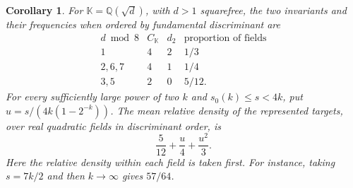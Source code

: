 \documentclass[11pt,letterpaper]{article}
\newtheorem{corollary}[corollary]{Corollary}
\theoremstyle{definition}
\numberwithin{equation}{section}
\begin{document}
\begin{corollary}\label{cor:quadratic-density}
For $\mathbb K=\mathbb Q(\sqrt d)$, with $d>1$ squarefree, the
two invariants and their frequencies when ordered by fundamental
discriminant are
\[
\begin{array}{c|c|c|c}
 d\bmod 8&C_{\mathbb K}& d_2&\text{proportion of fields}\\\hline
 1&4&2&1/3\\
 2,6,7&4&1&1/4\\
 3,5&2&0&5/12 .
\end{array}
\]
For every sufficiently large power of two $k$ and
$s_0(k)\le s<4k$, put $u=s/(4k(1-2^{-k}))$.
The mean relative density of the represented targets, over real quadratic
fields in discriminant order, is
\begin{equation}\label{eq:quadratic-density-polynomial}
                       \frac{5}{12}+\frac{u}{4}+\frac{u^2}{3}.
\end{equation}
Here the relative density within each field is taken first. For instance,
taking $s=7k/2$ and then $k\to\infty$ gives $57/64$.
\end{corollary}
\end{document}
